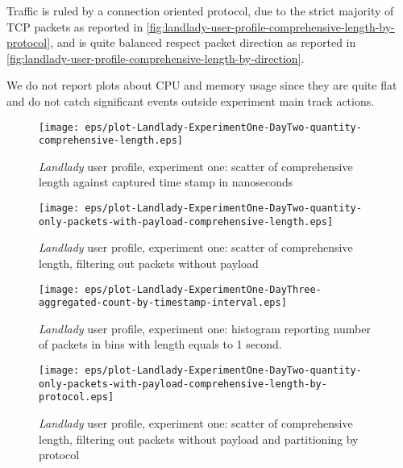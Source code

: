 \documentclass[10pt,a4paper]{article}
\begin{document}
    Traffic is ruled by a connection oriented protocol, due to the
    strict majority of TCP packets as reported in
    \autoref{fig:landlady-user-profile-comprehensive-length-by-protocol},
    and is quite balanced respect packet direction as reported in
    \autoref{fig:landlady-user-profile-comprehensive-length-by-direction}.
    
    We do not report plots about CPU and memory usage since they are
    quite flat and do not catch significant events outside experiment
    main track actions.

    \begin{figure}
      \centering
      \texttt{[image: eps/plot-Landlady-ExperimentOne-DayTwo-quantity-comprehensive-length.eps]}
      \caption{\emph{Landlady} user profile, experiment one:
        scatter of comprehensive length against captured time stamp in
        nanoseconds}
      \label{fig:landlady-user-profile-comprehensive-length-scatter}
    \end{figure}

    \begin{figure}
      \centering
      \texttt{[image: eps/plot-Landlady-ExperimentOne-DayTwo-quantity-only-packets-with-payload-comprehensive-length.eps]}
      \caption{\emph{Landlady} user profile, experiment one: scatter
        of comprehensive length, filtering out packets without
        payload}
      \label{fig:landlady-user-profile-comprehensive-length-scatter-filtering-on-payload}
    \end{figure}

    \begin{figure}
      \centering
      \texttt{[image: eps/plot-Landlady-ExperimentOne-DayThree-aggregated-count-by-timestamp-interval.eps]}
      \caption{\emph{Landlady} user profile, experiment one: histogram
        reporting number of packets in bins with length equals to 1
        second.}
      \label{fig:landlady-user-profile-exp-one-count-histogram}
    \end{figure}

    \begin{figure}
      \centering
      \texttt{[image: eps/plot-Landlady-ExperimentOne-DayTwo-quantity-only-packets-with-payload-comprehensive-length-by-protocol.eps]}
      \caption{\emph{Landlady} user profile, experiment one: scatter
        of comprehensive length, filtering out packets without payload
        and partitioning by protocol}
      \label{fig:landlady-user-profile-comprehensive-length-by-protocol}
    \end{figure}
\end{document}
